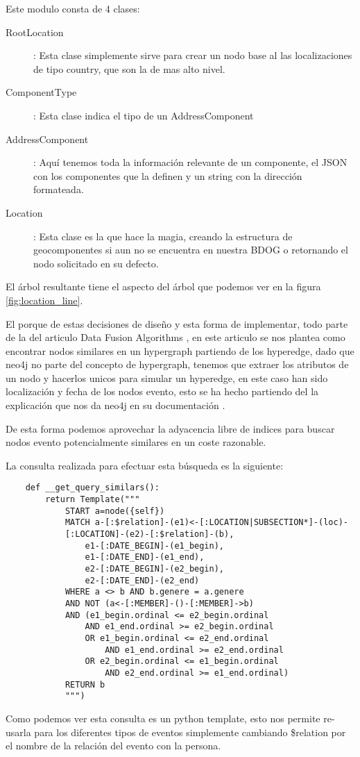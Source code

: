 Este modulo consta de 4 clases:
\begin{description}
\item[RootLocation]: Esta clase simplemente sirve para crear un nodo base al las localizaciones de tipo country, que son la de mas alto nivel.
\item[ComponentType]: Esta clase indica el tipo de un AddressComponent
\item[AddressComponent]: Aquí tenemos toda la información relevante de un componente, el JSON con los componentes que la definen y un string con la dirección formateada. 
\item[Location]: Esta clase es la que hace la magia, creando la estructura de geocomponentes si aun no se encuentra en nuestra BDOG o retornando el nodo solicitado en su defecto.
\end{description}

El árbol resultante tiene el aspecto del árbol que podemos ver en la figura \ref{fig:location_line}.

El porque de estas decisiones de diseño y esta forma de implementar, todo parte de la del articulo Data Fusion Algorithms \cite{datafusion}, en este articulo se nos plantea como encontrar nodos similares en un hypergraph partiendo de los hyperedge, dado que neo4j no parte del concepto de hypergraph, tenemos que extraer los atributos de un nodo y hacerlos unicos para simular un hyperedge, en este caso han sido localización y fecha de los nodos evento, esto se ha hecho partiendo del la explicación que nos da neo4j en su documentación \cite{neo4jhyperedges}.

De esta forma podemos aprovechar la adyacencia libre de indices para buscar nodos evento potencialmente similares en un coste razonable.

La consulta realizada para efectuar esta búsqueda es la siguiente:
\begin{lstlisting}
    def __get_query_similars():
        return Template("""
            START a=node({self})
            MATCH a-[:$relation]-(e1)<-[:LOCATION|SUBSECTION*]-(loc)-
            [:LOCATION]-(e2)-[:$relation]-(b),
                e1-[:DATE_BEGIN]-(e1_begin),
                e1-[:DATE_END]-(e1_end),
                e2-[:DATE_BEGIN]-(e2_begin),
                e2-[:DATE_END]-(e2_end)
            WHERE a <> b AND b.genere = a.genere
            AND NOT (a<-[:MEMBER]-()-[:MEMBER]->b)
            AND (e1_begin.ordinal <= e2_begin.ordinal 
            	AND e1_end.ordinal >= e2_begin.ordinal
                OR e1_begin.ordinal <= e2_end.ordinal 
                	AND e1_end.ordinal >= e2_end.ordinal
                OR e2_begin.ordinal <= e1_begin.ordinal 
                	AND e2_end.ordinal >= e1_end.ordinal)
            RETURN b
            """)
\end{lstlisting}
Como podemos ver esta consulta es un python template, esto nos permite re-usarla para los diferentes tipos de eventos simplemente cambiando \$relation por el nombre de la relación del evento con la persona.

